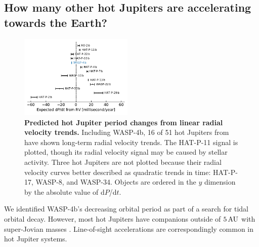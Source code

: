 \documentclass[12pt,twocolumn,tighten]{aastex62}
\begin{document}

\subsection{How many other hot Jupiters are accelerating towards the
Earth?}

\begin{figure}[t]
	\begin{center}
		\leavevmode
		\includegraphics[width=0.48\textwidth]{f5.pdf}
	\end{center}
	\vspace{-0.7cm}
	\caption{
  {\bf Predicted hot Jupiter period changes from linear radial
  velocity trends.} Including WASP-4b, 16 of 51 hot Jupiters from
  \citet{knutson_friends_2014} have shown long-term radial velocity
  trends.  The HAT-P-11 signal is plotted, though its radial velocity
  signal may be caused by stellar activity.  Three hot Jupiters are
  not plotted because their radial velocity curves better described as
  quadratic trends in time: HAT-P-17, WASP-8, and WASP-34.  Objects
  are ordered in the $y$ dimension by the absolute value of d$P$/d$t$.
	\label{fig:pdot_pop}
  \vspace{-0.3cm}
	}
\end{figure}

We identified WASP-4b's decreasing orbital period as part of a search
for tidal orbital decay.  However, most hot Jupiters have companions
outside of $5\,{\rm AU}$ with super-Jovian masses
\citep{knutson_friends_2014,bryan_statistics_2016}.  Line-of-sight accelerations are
correspondingly common in hot Jupiter systems. 
\end{document}
